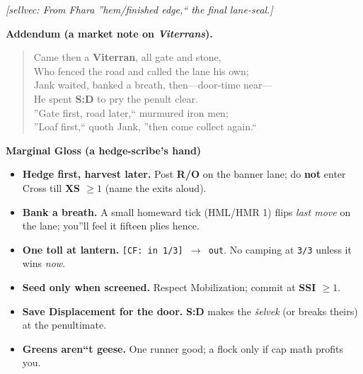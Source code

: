 \documentclass[11pt]{article}
\begin{document}
\noindent\textit{\small [\emph{sellvec:} From  Fhara ''hem/finished edge,`` the final lane-seal.]}

\medskip
\noindent\textbf{Addendum (a market note on \textit{Viterrans}).}
\begin{verse}
Came then a \textbf{Viterran}, all gate and stone,\\
Who fenced the road and called the lane his own;\\
Jank waited, banked a breath, then---door-time near---\\
He spent \textbf{S:D} to pry the penult clear.\\
''Gate first, road later,`` murmured iron men;\\
''Loaf first,`` quoth Jank, ''then come collect again.``
\end{verse}

\medskip
\noindent\textbf{Marginal Gloss (a hedge-scribe's hand)}
\begin{itemize}\setlength{\itemsep}{0.15em}
  \item \textbf{Hedge first, harvest later.} Post \textbf{R/O} on the banner lane; do \textbf{not} enter Cross till \textbf{XS $\ge 1$} (name the exits aloud).
  \item \textbf{Bank a breath.} A small homeward tick (\textsc{HML/HMR 1}) flips \emph{last move} on the lane; you''ll feel it fifteen plies hence.
  \item \textbf{One toll at lantern.} \texttt{[CF: in 1/3] $\rightarrow$ out}. No camping at \texttt{3/3} unless it wins \emph{now}.
  \item \textbf{Seed only when screened.} Respect Mobilization; commit at \textbf{SSI $\ge 1$}.
  \item \textbf{Save Displacement for the door.} \textbf{S:D} makes the \emph{šelvek} (or breaks theirs) at the penultimate.
  \item \textbf{Greens aren``t geese.} One runner good; a flock only if cap math profits you.
\end{itemize}

\clearpage
\end{document}
